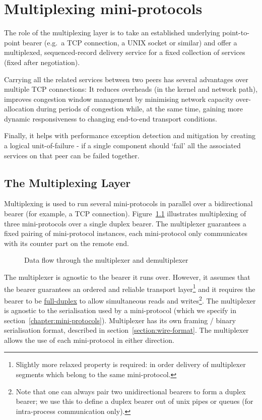 \chapter{Multiplexing mini-protocols}
\label{chapter:multiplexer}

The role of the multiplexing layer is to take an established underlying
point-to-point bearer (e.g.~a TCP connection, a UNIX socket or similar) and
offer a multiplexed, sequenced-record delivery service for a fixed collection of
services (fixed after negotiation). 

Carrying all the related services between two peers has several advantages over
multiple TCP connections: It reduces overheads (in the kernel and network path),
improves congestion window management by minimising network capacity
over-allocation during periods of congestion while, at the same time, gaining
more dynamic responsiveness to changing end-to-end transport conditions.

Finally, it helps with performance exception detection and mitigation by creating
a logical unit-of-failure - if a single component should `fail' all the
associated services on that peer can be failed together.

\section{The Multiplexing Layer}
\label{multiplexing-section}
Multiplexing is used to run several mini-protocols in parallel over
a bidirectional bearer (for example, a TCP connection).
Figure~\ref{mux-diagram} illustrates multiplexing of three mini-protocols over
a single duplex bearer.  The multiplexer guarantees a fixed pairing of
mini-protocol instances, each mini-protocol only communicates with its counter
part on the remote end.

\begin{figure}[ht]
\begin{center}
\end{center}
\caption{Data flow through the multiplexer and demultiplexer}
\label{mux-diagram}
\end{figure}


The multiplexer is agnostic to the bearer it runs over. However, it assumes that
the bearer guarantees an ordered and reliable transport layer\footnote{Slightly
more relaxed property is required: in order delivery of multiplexer segments
which belong to the same mini-protocol.} and it requires the bearer to be
\href{https://www.wikiwand.com/en/Duplex_(telecommunications)\#/Full-duplex}{full-duplex}
to allow simultaneous reads and writes\footnote{Note that one can always pair
two unidirectional bearers to form a duplex bearer; we use this to define
a duplex bearer out of unix pipes or queues (for intra-process communication
only).}.  The multiplexer is agnostic to the serialisation used by
a mini-protocol (which we specify in section~\ref{chapter:mini-protocols}).
Multiplexer has its own framing / binary serialisation format, 
described in section~\ref{section:wire-format}.  The multiplexer allows the use
of each mini-protocol in either direction.


